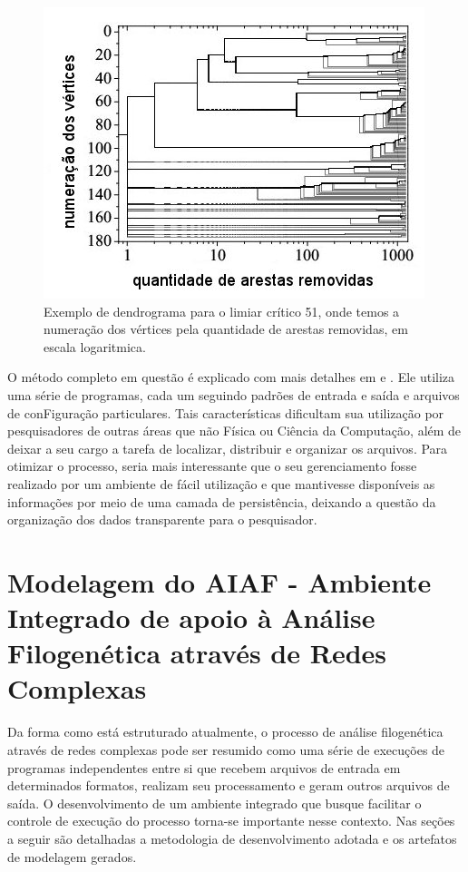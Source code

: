 \begin{figure}
\centering
\includegraphics[scale=0.73]{dendrograma}
\caption{Exemplo de dendrograma para o limiar crítico 51, onde temos a numeração dos vértices pela quantidade de arestas removidas, em escala logaritmica.}
\label{fig:dendrograma}
\end{figure}

O método completo em questão é explicado com mais detalhes em \cite{goesneto2010} e \cite{andrade2011}. Ele utiliza uma série de programas, cada um
seguindo padrões de entrada e saída e arquivos de conFiguração particulares. Tais características dificultam sua utilização por pesquisadores de outras
áreas que não Física ou Ciência da Computação, além de deixar a seu cargo a tarefa de localizar, distribuir e organizar os arquivos. Para otimizar
o processo, seria mais interessante que o seu gerenciamento fosse realizado por um ambiente de fácil utilização e que
mantivesse disponíveis as informações por meio de uma camada de persistência, deixando a questão da organização dos dados transparente para o
pesquisador.

\chapter{Modelagem do AIAF - Ambiente Integrado de apoio à Análise Filogenética através de Redes Complexas}
\label{cap:navi}

Da forma como está estruturado atualmente, o processo de análise filogenética através de redes complexas pode ser resumido como uma série de execuções
de programas independentes entre si que recebem arquivos
de entrada em determinados formatos, realizam seu
processamento e geram outros arquivos de saída. O desenvolvimento de um ambiente integrado que busque facilitar o controle de execução do processo
torna-se importante nesse contexto. Nas seções a seguir são detalhadas a metodologia de desenvolvimento adotada e
os artefatos de modelagem gerados.

